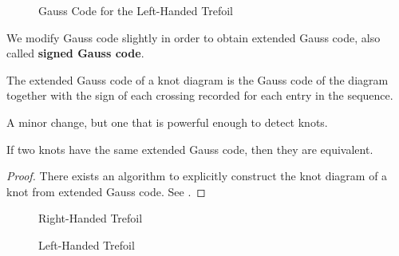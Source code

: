         \begin{figure}
            \centering
            \caption{Gauss Code for the Left-Handed Trefoil}
            \label{fig:left_handed_trefoil_gauss_code}
        \end{figure}
        \par\hfill\par
        We modify Gauss code slightly in order to obtain
        extended Gauss code, also called \textbf{signed Gauss code}.
        \begin{definition}
            The extended Gauss code of a knot diagram is the Gauss code of the
            diagram together with the sign of each crossing recorded for each
            entry in the sequence.
        \end{definition}
        A minor change, but one that is powerful enough to detect knots.
        \begin{theorem}
            If two knots have the same extended Gauss code, then they are
            equivalent.
        \end{theorem}
        \begin{proof}
            There exists an algorithm to explicitly construct the knot diagram
            of a knot from extended Gauss code. See
            \cite{KauffmanVirtualKnots1999}.
        \end{proof}
        \begin{figure}
            \centering
            \begin{minipage}[b]{0.49\textwidth}
                \centering
                \caption[Right-Handed Trefoil Extended Gauss Code]
                {Right-Handed Trefoil}
                \label{fig:trefoil_knot_oriented_with_extended_gauss_code}
            \end{minipage}
            \hfill
            \begin{minipage}[b]{0.49\textwidth}
                \centering
            \caption[Left-Handed Trefoil Extended Gauss Code]
            {Left-Handed Trefoil}
            \label{fig:trefoil_knot_mirror_oriented_with_extended_gauss_code}
            \end{minipage}
        \end{figure}
